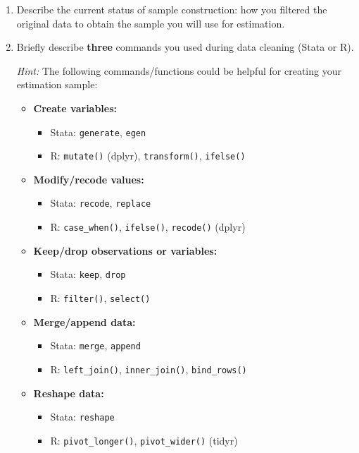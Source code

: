 \documentclass[paper=a4, fontsize=11pt]{scrartcl} %
\begin{document}
\begin{enumerate}
\item Describe the current status of sample construction: how you filtered the original data to obtain the sample you will use for estimation.

\item Briefly describe \textbf{three} commands you used during data cleaning (Stata or R).

\textit{Hint:} The following commands/functions could be helpful for creating your estimation sample:

\begin{itemize}
\item \textbf{Create variables:}
\begin{itemize}
\item Stata: \texttt{generate}, \texttt{egen}
\item R: \texttt{mutate()} (dplyr), \texttt{transform()}, \texttt{ifelse()}
\end{itemize}

\item \textbf{Modify/recode values:}
\begin{itemize}
\item Stata: \texttt{recode}, \texttt{replace}
\item R: \texttt{case\_when()}, \texttt{ifelse()}, \texttt{recode()} (dplyr)
\end{itemize}

\item \textbf{Keep/drop observations or variables:}
\begin{itemize}
\item Stata: \texttt{keep}, \texttt{drop}
\item R: \texttt{filter()}, \texttt{select()}
\end{itemize}

\item \textbf{Merge/append data:}
\begin{itemize}
\item Stata: \texttt{merge}, \texttt{append}
\item R: \texttt{left\_join()}, \texttt{inner\_join()}, \texttt{bind\_rows()}
\end{itemize}

\item \textbf{Reshape data:}
\begin{itemize}
\item Stata: \texttt{reshape}
\item R: \texttt{pivot\_longer()}, \texttt{pivot\_wider()} (tidyr)
\end{itemize}


\end{itemize}
\end{enumerate}
\end{document}
